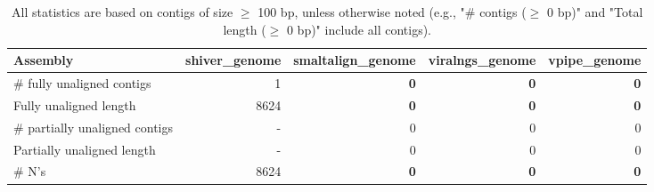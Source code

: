 \documentclass[12pt,a4paper]{article}
\begin{document}
\begin{table}[ht]
\begin{center}
\caption{All statistics are based on contigs of size $\geq$ 100 bp, unless otherwise noted (e.g., "\# contigs ($\geq$ 0 bp)" and "Total length ($\geq$ 0 bp)" include all contigs).}
\begin{tabular}{|l*{4}{|r}|}
\hline
Assembly & shiver\_genome & smaltalign\_genome & viralngs\_genome & vpipe\_genome \\ \hline
\# fully unaligned contigs & 1 & {\bf 0} & {\bf 0} & {\bf 0} \\ \hline
Fully unaligned length & 8624 & {\bf 0} & {\bf 0} & {\bf 0} \\ \hline
\# partially unaligned contigs & - & 0 & 0 & 0 \\ \hline
Partially unaligned length & - & 0 & 0 & 0 \\ \hline
\# N's & 8624 & {\bf 0} & {\bf 0} & {\bf 0} \\ \hline
\end{tabular}
\end{center}
\end{table}
\end{document}
